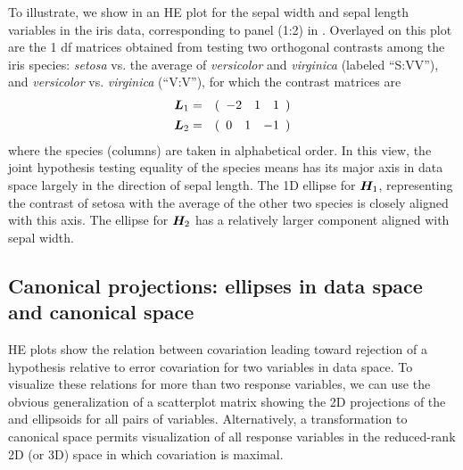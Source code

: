 To illustrate, we show in  an HE plot for the sepal width and sepal length variables in the iris data,
corresponding to panel (1:2) in . Overlayed on this plot are the
1 df  matrices obtained from testing two orthogonal contrasts among the iris species:
\emph{setosa} vs. the average of \emph{versicolor} and \emph{virginica} (labeled ``S:VV''), and \emph{versicolor} vs. \emph{virginica} (``V:V''), for which the contrast matrices are
\begin{eqnarray*}
\bm{L}_1 & = &
( \begin{array}{rrr}
-2 & 1 & 1
\end{array} )
\\
\bm{L}_2 & = &
( \begin{array}{rrr}
0 & 1 & -1
\end{array} )
\end{eqnarray*}
where the species (columns) are taken in alphabetical order. In this view, the joint hypothesis testing
equality of the species means has its major axis in data space largely in the direction of sepal length.
The 1D ellipse for $\bm{H}_1$, representing the contrast of setosa with the average of the other two species
is closely aligned with this axis. The ellipse for $\bm{H}_2$ has a relatively larger component aligned
with sepal width. 

\subsection{Canonical projections: ellipses in data space and canonical space}
HE plots show the relation between covariation leading toward rejection of a hypothesis relative to
error covariation for two variables in data space. To visualize these relations for more than two
response variables, we can use the obvious generalization of a scatterplot matrix showing the 2D 
projections of the  and  ellipsoids for all pairs of variables.
Alternatively, a transformation to canonical space permits visualization of all response variables
in the reduced-rank 2D (or 3D) space in which  covariation is maximal.


